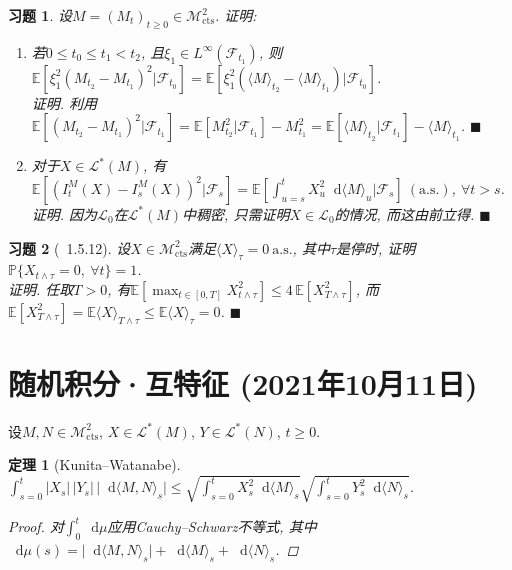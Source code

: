 \documentclass{ctexart}
\theoremstyle{definition}
\theoremstyle{remark}
\theoremstyle{plain}
\newtheorem{Thm}[Def]{定理}
\newtheorem{Ex}{习题}[section]
\newenvironment{Prf}{\vspace{1ex}\textbf{\\}{\color{red}\textit{证明}}.\normalfont}{\color{red}\hfill$\blacksquare$\vspace{1ex}\par}
\newcommand{\1}{\mathbbm{1}}				%
\newcommand{\as}{\mathrm{a.s.}}				%
\renewcommand{\P}{\mathbb{P}}				%
\newcommand{\E}{\mathbb{E}}					%
\newcommand{\agp}[1]{\langle #1 \rangle}	%
\newcommand{\abs}[1]{\lvert#1\rvert}			%
\newcommand{\tint}{\textstyle\int\nolimits}
\renewcommand*{\d}{\mathop{}\!\mathrm{d}}	%
\begin{document}
\begin{Ex}
设$M = (M_{t})_{t \ge 0} \in \mathcal{M}^{2}_{\mathrm{cts}}$. 证明:
\begin{enumerate}
\setlength{\itemsep}{0ex}
	\item 若$0 \le t_{0} \le t_{1} < t_{2}$, 且$\xi_{1} \in L^{\infty}(\mathscr{F}_{t_1})$, 则$\E[\xi_{1}^{2}(M_{t_2}-M_{t_1})^{2}|\mathscr{F}_{t_0}] = \E[\xi_{1}^{2}(\agp{M}_{t_2}-\agp{M}_{t_1})|\mathscr{F}_{t_0}]$.
\begin{Prf}
利用$\E[(M_{t_2}-M_{t_1})^{2}|\mathscr{F}_{t_1}] = \E[M_{t_2}^{2}|\mathscr{F}_{t_1}]-M_{t_1}^{2} = \E[\agp{M}_{t_2}|\mathscr{F}_{t_1}]-\agp{M}_{t_1}$.
\end{Prf}
	\item 对于$X \in \mathcal{L}^{*}(M)$, 有$\E[(I^{M}_{t}(X)-I^{M}_{s}(X))^{2}|\mathscr{F}_{s}] = \E[\tint_{u=s}^{t}X_{u}^{2}\d\agp{M}_{u}|\mathscr{F}_{s}] ~(\as)$, $\forall t > s$.
\begin{Prf}
因为$\mathcal{L}_{0}$在$\mathcal{L}^{*}(M)$中稠密, 只需证明$X \in \mathcal{L}_{0}$的情况, 而这由前立得.
\end{Prf}
\end{enumerate}
\end{Ex}


\begin{Ex}[\cite{Karatzas-Shreve--GTM113}~1.5.12]
设$X \in \mathcal{M}_{\mathrm{cts}}^{2}$满足$\agp{X}_{\tau} = 0 ~\as$, 其中$\tau$是停时, 证明$\P\{ X_{t\wedge\tau} = 0 , \ \forall t \} = 1$.
\begin{Prf}
任取$T > 0$, 有$\E[\max_{t \in [0,T]} X_{t\wedge\tau}^{2}] \le 4 \,\E[X_{T\wedge\tau}^{2}]$, 而$\E[X_{T\wedge\tau}^{2}] = \E\agp{X}_{T\wedge\tau} \le \E\agp{X}_{\tau} = 0$.
\end{Prf}
\end{Ex}



\section{随机积分·互特征 \normalfont\footnotesize (2021年10月11日)}
设$M,N \in \mathcal{M}^{2}_{\mathrm{cts}}$, $X \in \mathcal{L}^{*}(M)$, $Y \in \mathcal{L}^{*}(N)$, $t \ge 0$.

\begin{Thm}[Kunita--Watanabe]
$\tint_{s=0}^{t} \abs{X_{s}}\,\abs{Y_{s}} \,\abs{\d\agp{M,N}_{s}} \le \sqrt{\tint_{s=0}^{t} X_{s}^{2} \d\agp{M}_{s}} \sqrt{\tint_{s=0}^{t} Y_{s}^{2} \d\agp{N}_{s}}$.
\begin{proof}
对$\tint_{0}^{t} \d\mu$应用Cauchy--Schwarz不等式, 其中$\d\mu(s) = \abs{\d\agp{M,N}_{s}} + \d\agp{M}_{s} + \d\agp{N}_{s}$.
\end{proof}
\end{Thm}
\end{document}
